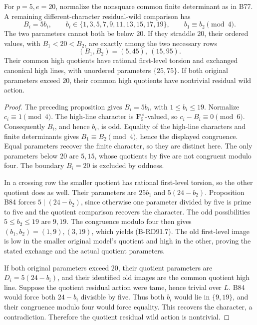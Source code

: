 \begin{proposition}[The crossing parameters at \(p=5\)]
\label{prop:B-RD91-parameters}
For \(p=5,e=20\), normalize the nonsquare common finite determinant
as in B77. A remaining different-character residual-wild comparison
has
\[
 B_i=5b_i,\qquad b_i\in\{1,3,5,7,9,11,13,15,17,19\},
 \qquad b_1\equiv b_2\pmod4.                         \tag{B-RD91.6}
\]
The two parameters cannot both be below \(20\). If they straddle
\(20\), their ordered values, with \(B_1<20<B_2\), are exactly
among the two necessary rows
\[
                 (B_1,B_2)=(5,45),\ (15,95).          \tag{B-RD91.7}
\]
Their common high quotients have rational first-level torsion and
exchanged canonical high lines, with unordered parameters
\(\{25,75\}\). If both original parameters exceed \(20\), their
common high quotients have nontrivial residual wild action.
\end{proposition}
\begin{proof}
The preceding proposition gives \(B_i=5b_i\), with
\(1\le b_i\le19\). Normalize \(c_i\equiv1\pmod4\).
The high-line character is \(\mathbf F_5^\times\)-valued, so
\(c_i-B_i\equiv0\pmod6\). Consequently \(B_i\), and hence
\(b_i\), is odd. Equality of the high-line characters and finite
determinants gives \(B_1\equiv B_2\pmod4\), hence the displayed
congruence. Equal parameters recover the finite character, so they
are distinct here. The only parameters below \(20\) are \(5,15\),
whose quotients by five are not congruent modulo four. The boundary
\(B_i=20\) is excluded by oddness.

In a crossing row the smaller quotient has rational first-level
torsion, so the other quotient does as well. Their parameters are
\(25b_1\) and \(5(24-b_2)\). Proposition B84 forces
\(5\mid(24-b_2)\), since otherwise one parameter divided by five
is prime to five and the quotient comparison recovers the character.
The odd possibilities \(5\le b_2\le19\) are \(9,19\). The
congruence modulo four then gives \((b_1,b_2)=(1,9),(3,19)\),
which yields (B-RD91.7). The old first-level image is low in the
smaller original model's quotient and high in the other, proving
the stated exchange and the actual quotient parameters.

If both original parameters exceed \(20\), their quotient
parameters are \(D_i=5(24-b_i)\), and their identified old images
are the common quotient high line. Suppose the quotient residual
action were tame, hence trivial over \(L\). B84 would force
both \(24-b_i\) divisible by five. Thus both \(b_i\) would lie
in \(\{9,19\}\), and their congruence modulo four would force
equality. This recovers the character, a contradiction. Therefore
the quotient residual wild action is nontrivial.
\end{proof}

